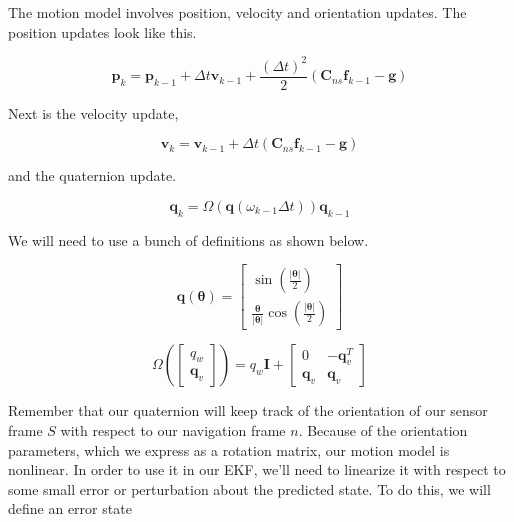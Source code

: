 The motion model involves position, velocity and orientation updates. The position updates look like this. 

\begin{equation}
\mathbf{p}_k = \mathbf{p}_{k-1} + \Delta t \mathbf{v}_{k-1} + \frac{(\Delta t)^2}{2}(\mathbf{C}_{ns}\mathbf{f}_{k-1} - \mathbf{g}) 
\end{equation}

Next is the velocity update,


\begin{equation}
\mathbf{v}_k = \mathbf{v}_{k-1} + \Delta t (\mathbf{C}_{ns}\mathbf{f}_{k-1} - \mathbf{g}) 
\end{equation}

and the quaternion update. 

\begin{equation}
\mathbf{q}_k = \Omega (\mathbf{q}(\omega_{k-1} \Delta t))\mathbf{q}_{k-1} 
\end{equation}

We will need to use a bunch of definitions as shown below. 


\begin{equation}
\mathbf{q}(\mathbf{\theta})  = 
\begin{bmatrix}
\sin(\frac{|\mathbf{\theta}|}{2}) \\
\frac{\mathbf{\theta}}{|\mathbf{\theta}|}\cos(\frac{|\mathbf{\theta}|}{2})
\end{bmatrix} 
\end{equation}

\begin{equation}
\Omega( 
\begin{bmatrix}
q_w \\
\mathbf{q}_{v}
\end{bmatrix}) = q_w \mathbf{I} + 
\begin{bmatrix}
0 & - \mathbf{q}_{v}^T \\
\mathbf{q}_{v} & \mathbf{q}_{v} 
\end{bmatrix}
\end{equation}

Remember that our quaternion will keep track of
the orientation of our sensor frame $S$ with respect to
our navigation frame $n$. Because of the orientation parameters, which we express as
a rotation matrix, our motion model is nonlinear. In order to use it in our EKF, we'll need to linearize
it with respect to some small error or perturbation about
the predicted state. To do this, we will define an error state

